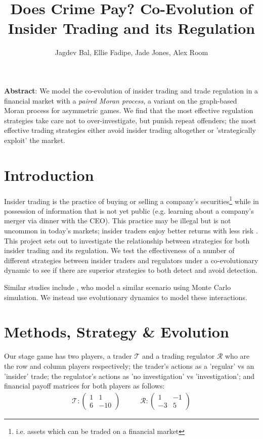 \documentclass{article}
\title{Does Crime Pay? Co-Evolution of Insider Trading and its Regulation}
\author{Jagdev Bal, Ellie Fadipe, Jade Jones, Alex Room}
\date{}
\begin{document}
\maketitle
\textbf{Abstract}:
We model the co-evolution of insider trading and trade regulation in a financial market with a \emph{paired Moran process}, a variant on the graph-based Moran process for asymmetric games. We find that the most effective regulation strategies take care not to over-investigate, but punish repeat offenders; the most effective trading strategies either avoid insider trading altogether or 'strategically exploit' the market.

\section{Introduction}
Insider trading is the practice of buying or selling a company’s securities\footnote{i.e. assets which can be traded on a financial market} while in possession of information that is not yet public (e.g. learning about a company's merger via dinner with the CEO). This practice may be illegal but is not uncommon in today's markets; insider traders enjoy better returns with less risk \parencite{bainbridge1998insider}. This project sets out to investigate the relationship between strategies for both insider trading and its regulation. We test the effectiveness of a number of different strategies between insider traders and regulators under a co-evolutionary dynamic to see if there are superior strategies to both detect and avoid detection. 

Similar studies include \textcite{smales2017game}, who model a similar scenario using Monte Carlo simulation. We instead use evolutionary dynamics to model these interactions.

\section{Methods, Strategy \& Evolution}
Our stage game has two players, a trader $\mathcal{T}$ and a trading regulator $\mathcal{R}$ who are the row and column players respectively; the trader's actions as a 'regular' vs an 'insider' trade; the regulator's actions as 'no investigation' vs 'investigation'; and financial payoff matrices for both players as follows:
\begin{equation*}
\begin{split}
    \mathcal{T}: 
    \begin{pmatrix}
    1 & 1 \\
    6 & -10
    \end{pmatrix}
\end{split}
\quad\quad
\begin{split}
    \mathcal{R}: 
    \begin{pmatrix}
    1 & -1 \\
    -3 & 5
    \end{pmatrix}
\end{split}
\end{equation*}
\end{document}
